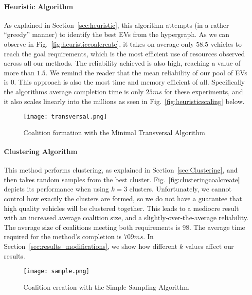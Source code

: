 \paragraph{Heuristic Algorithm}
As explained in Section~\ref{sec:heuristic}, this algorithm attempts (in a rather ``greedy'' manner) to identify the best EVs from the hypergraph.	As we can observe in Fig.~\ref{fig:heuristiccoalcreate}, it takes on average only $58.5$ vehicles to reach the goal requirements, which is the most efficient use of resources observed across all our methods. The reliability achieved is also high, reaching a value of more than $1.5$. We remind the reader that the mean reliability of our pool of EVs is $0$. This approach is also the most time and memory efficient of all. Specifically the algorithms average completion time is only $25ms$ for these experiments, and it also scales linearly into the millions as seen in Fig.~\ref{fig:heuristicscaling} below.	
\begin{figure}
	\centering
	\texttt{[image: transversal.png]}
	\caption{Coalition formation with the\newline
		Minimal Transversal Algorithm \label{fig:transversalcoalcreate}}
\end{figure}
\paragraph{Clustering Algorithm}
This method performs clustering, as explained in Section~\ref{sec:Clustering}, and then takes random samples from the best cluster. Fig.~\ref{fig:clusteringcoalcreate} depicts its performance when using $k=3$ clusters. Unfortunately, we cannot control how exactly the clusters are formed, so we do not have a guarantee that high quality vehicles will be clustered together. This leads to a mediocre result with an increased average coalition size, and a slightly-over-the-average reliability. The average size of coalitions meeting both requirements is $98$. The average time required for the method's completion is $709 ms$. In Section~\ref{sec:results_modifications}, we show how different $k$ values affect our results.
\begin{figure}		
	\centering
		\texttt{[image: sample.png]}
		\caption{Coalition creation with the\newline
			Simple Sampling Algorithm \label{fig:samplecoalcreate}}
\end{figure}
